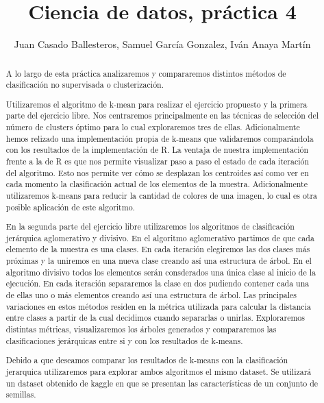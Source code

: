 \documentclass [a4paper] {article}
\title{Ciencia de datos, práctica 4}
\author{Juan Casado Ballesteros, Samuel García Gonzalez, Iván Anaya Martín}
\begin{document}
\maketitle

\begin{abstract}
A lo largo de esta práctica analizaremos y compararemos distintos métodos de clasificación no supervisada o clusterización.

Utilizaremos el algoritmo de k-mean para realizar el ejercicio propuesto y la primera parte del ejercicio libre.
Nos centraremos principalmente en las técnicas de selección del número de clusters óptimo para lo cual exploraremos tres de ellas.
Adicionalmente hemos relizado una implementación propia de k-means que validaremos comparándola con los resultados de la implementación de R.
La ventaja de nuestra implementación frente a la de R es que nos permite visualizar paso a paso el estado de cada iteración del algoritmo.
Esto nos permite ver cómo se desplazan los centroides así como ver en cada momento la clasificación actual de los elementos de la muestra.
Adicionalmente utilizaremos k-means para reducir la cantidad de colores de una imagen, lo cual es otra posible aplicación de este algoritmo.

En la segunda parte del ejercicio libre utilizaremos los algoritmos de clasificación jerárquica aglomerativo y divisivo.
En el algoritmo aglomerativo partimos de que cada elemento de la muestra es una clases.
En cada iteración elegiremos las dos clases más próximas y la uniremos en una nueva clase creando así una estructura de árbol.
En el algoritmo divisivo todos los elementos serán consderados una única clase al inicio de la ejecución.
En cada iteración separaremos la clase en dos pudiendo contener cada una de ellas uno o más elementos creando así una estructura de árbol.
Las principales variaciones en estos métodos residen en la métrica utilizada para calcular la distancia entre clases a partir de la cual decidimos cuando separarlas o unirlas.
Exploraremos distintas métricas, visualizaremos los árboles generados y compararemos las clasificaciones jerárquicas entre si y con los resultados de k-means.

Debido a que deseamos comparar los resultados de k-means con la clasificación jerarquica utilizaremos para explorar ambos algoritmos el mismo dataset.
Se utilizará un dataset obtenido de kaggle en que se presentan las características de un conjunto de semillas.
\end{abstract}

\newpage
\tableofcontents
\end{document}
